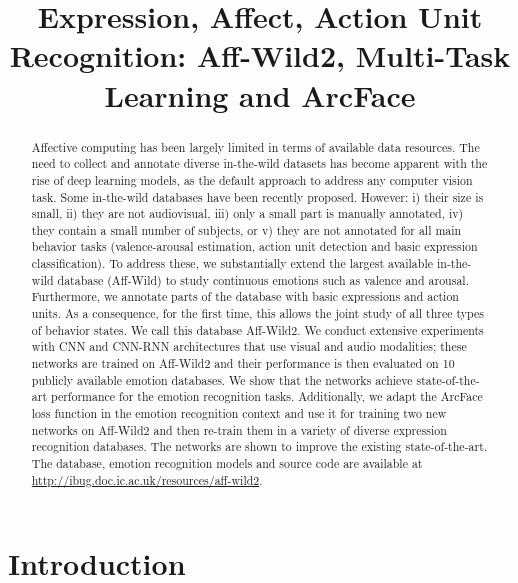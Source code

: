 \documentclass{bmvc2k}
\title{Expression, Affect, Action Unit Recognition: Aff-Wild2, Multi-Task Learning and ArcFace}
\begin{document}
\maketitle

\begin{abstract}
Affective computing has been largely limited in terms of available data resources. 
The need to collect and annotate diverse in-the-wild datasets has become apparent with the rise of deep learning models, as the default approach to address any computer vision task.
Some in-the-wild databases have been recently proposed. However: i) their size is small, ii) they are not audiovisual, iii) only a small part is manually annotated, iv) they  contain a small number of subjects, or v) they are not annotated for all main behavior tasks (valence-arousal estimation, action unit detection and basic expression classification). To address these, we substantially extend the largest available in-the-wild database (Aff-Wild) to study continuous emotions such as valence and arousal. Furthermore, we annotate parts of the database with basic expressions and action units. As a consequence, for the first time, this allows the joint study of all three types of behavior states. We call this database Aff-Wild2. We conduct extensive experiments with CNN and CNN-RNN architectures that use visual and audio modalities; these networks are trained on Aff-Wild2 and their performance is then evaluated on 10 publicly available emotion databases. We show that the networks achieve state-of-the-art performance for the emotion recognition tasks. Additionally, we adapt the ArcFace loss function in the emotion recognition context and use it for training two new networks on Aff-Wild2 and then re-train them in a variety of diverse expression recognition databases. The networks are shown to improve the existing state-of-the-art. The database, emotion recognition models and source code are available at \url{http://ibug.doc.ic.ac.uk/resources/aff-wild2}.
\end{abstract}

\section{Introduction}
\label{sec:intro}
\end{document}
